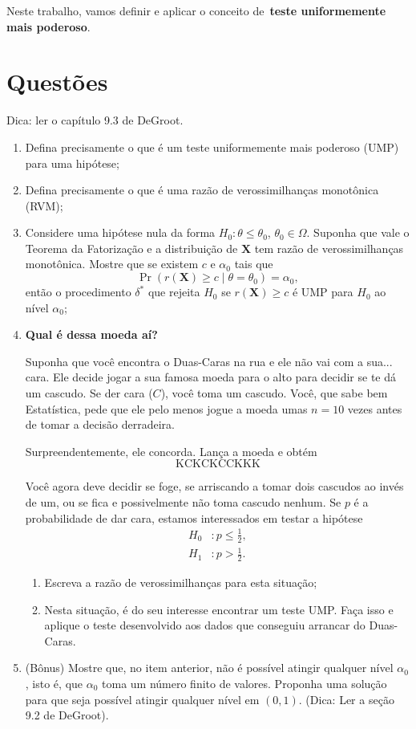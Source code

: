 \documentclass[a4paper,10pt, notitlepage]{report}
\newcommand{\pr}{\operatorname{Pr}} %
\newcommand{\bX}{\boldsymbol{X}} %
\begin{document}
Neste trabalho, vamos definir e aplicar o conceito de~\textbf{teste uniformemente mais poderoso}.

\section*{Questões}
Dica: ler o capítulo 9.3 de DeGroot.
\begin{enumerate}
 \item Defina precisamente o que é um teste uniformemente mais poderoso (UMP) para uma hipótese;
 \item Defina precisamente o que é uma razão de verossimilhanças monotônica (RVM);
 \item Considere uma hipótese nula  da forma $H_0: \theta \leq \theta_0$, $\theta_0 \in \Omega$.
 Suponha que vale o Teorema da Fatorização e a distribuição de $\bX$ tem razão de verossimilhanças monotônica.
 Mostre que se existem $c$ e $\alpha_0$ tais que
 \begin{equation}
  \pr\left(r(\bX) \geq c \mid \theta = \theta_0\right) = \alpha_0,
 \end{equation}
então o procedimento $\delta^\ast$ que rejeita $H_0$ se $r(\bX) \geq c$ é UMP para $H_0$ ao nível $\alpha_0$;

\item \textbf{Qual é dessa moeda aí?}

Suponha que você encontra o Duas-Caras na rua e ele não vai com a sua... cara. 
Ele decide jogar a sua famosa moeda para o alto para decidir se te dá um cascudo.
Se der cara ($C$), você toma um cascudo.
Você, que sabe bem Estatística, pede que ele pelo menos jogue a moeda umas $n=10$ vezes antes de tomar a decisão derradeira.

Surpreendentemente, ele concorda. 
Lança a moeda e obtém
$$ \text{KCKCKCCKKK} $$

Você agora deve decidir se foge, se arriscando a tomar dois cascudos ao invés de um, ou se fica e  possivelmente não toma cascudo nenhum.
Se $p$ é a probabilidade de dar cara, estamos interessados em testar a hipótese
  \begin{align*}
   H_0 &:  p \leq \frac{1}{2},\\
   H_1 &:p > \frac{1}{2}.
  \end{align*}

\begin{enumerate}
 \item Escreva a razão de verossimilhanças para esta situação;
 \item Nesta situação, é do seu interesse encontrar um teste UMP.
 Faça isso e aplique o teste desenvolvido aos dados que conseguiu arrancar do Duas-Caras.
\end{enumerate}
\item (Bônus) Mostre que, no item anterior, não é possível atingir qualquer nível $\alpha_0$, isto é, que $\alpha_0$ toma um número finito de valores.
Proponha uma solução para que seja possível atingir qualquer nível em $(0, 1)$. (Dica: Ler a seção 9.2 de DeGroot).
\end{enumerate}

% 
% 
\end{document}
